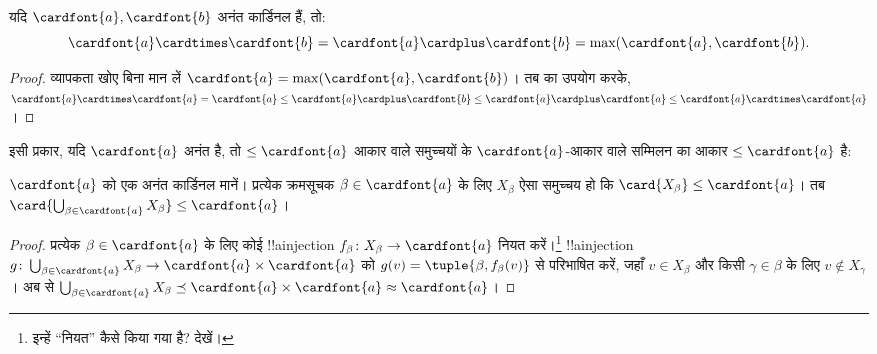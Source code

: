 \documentclass[../../../include/open-logic-section]{subfiles}
\begin{document}
\begin{thm}
यदि $\cardfont{a},\cardfont{b}$ अनंत कार्डिनल हैं, तो:
\[
	\cardfont{a}
\cardtimes \cardfont{b} = \cardfont{a} \cardplus \cardfont{b} =
\text{max}(\cardfont{a}, \cardfont{b}).
\]
\end{thm}

\begin{proof}
व्यापकता खोए बिना मान लें $\cardfont{a}=\max(\cardfont{a},
\cardfont{b})$। तब  का उपयोग करके,
$\cardfont{a}\cardtimes\cardfont{a} = \cardfont{a} \leq \cardfont{a}
\cardplus \cardfont{b} \leq \cardfont{a} \cardplus \cardfont{a} \leq
\cardfont{a}\cardtimes\cardfont{a}$। \end{proof}\noindent इसी प्रकार,
यदि $\cardfont{a}$ अनंत है, तो $\leq\cardfont{a}$ आकार वाले समुच्चयों के
$\cardfont{a}$-आकार वाले सम्मिलन का आकार $\leq\cardfont{a}$ है:

\begin{prop}
$\cardfont{a}$ को एक अनंत कार्डिनल मानें। प्रत्येक क्रमसूचक
$\beta\in\cardfont{a}$ के लिए $X_\beta$ ऐसा समुच्चय हो कि
$\card{X_\beta}\leq\cardfont{a}$। तब
$\card{\bigcup_{\beta\in\cardfont{a}}X_\beta}\leq\cardfont{a}$।
\end{prop}

\begin{proof}
प्रत्येक $\beta\in\cardfont{a}$ के लिए कोई !!a{injection}
$f_\beta\colon X_\beta\to\cardfont{a}$ नियत करें।\footnote{इन्हें
``नियत'' कैसे किया गया है? 
देखें।} !!a{injection}
$g\colon\bigcup_{\beta\in\cardfont{a}}X_\beta\to
\cardfont{a}\times\cardfont{a}$ को
$g(v)=\tuple{\beta,f_\beta(v)}$ से परिभाषित करें, जहाँ $v\in X_\beta$ और
किसी $\gamma\in\beta$ के लिए $v\notin X_\gamma$। अब
 से
$\bigcup_{\beta\in\cardfont{a}}X_\beta\preceq
\cardfont{a}\times\cardfont{a}\approx\cardfont{a}$।
\end{proof}
\end{document}
